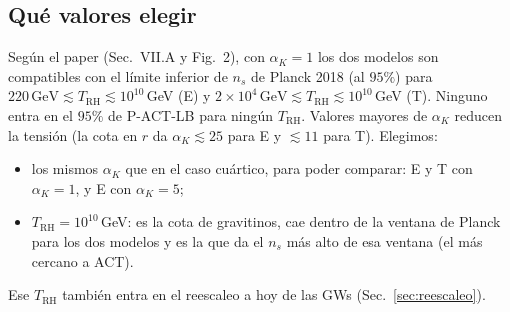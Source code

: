 \documentclass[11pt]{article}
\begin{document}
        \subsection{Qué valores elegir}

            Según el paper (Sec.~VII.A y Fig.~2), con $\alpha_K = 1$ los dos modelos son compatibles con el límite inferior de $n_s$ de Planck 2018 (al $95\%$) para $220\,\text{GeV} \lesssim T_{\text{RH}} \lesssim 10^{10}$\,GeV (E) y $2 \times 10^4\,\text{GeV} \lesssim T_{\text{RH}} \lesssim 10^{10}$\,GeV (T). Ninguno entra en el $95\%$ de P-ACT-LB para ningún $T_{\text{RH}}$. Valores mayores de $\alpha_K$ reducen la tensión (la cota en $r$ da $\alpha_K \lesssim 25$ para E y $\lesssim 11$ para T). Elegimos:
            \begin{itemize}
                \item los mismos $\alpha_K$ que en el caso cuártico, para poder comparar: E y T con $\alpha_K = 1$, y E con $\alpha_K = 5$;
                \item $T_{\text{RH}} = 10^{10}$\,GeV: es la cota de gravitinos, cae dentro de la ventana de Planck para los dos modelos y es la que da el $n_s$ más alto de esa ventana (el más cercano a ACT).
            \end{itemize}
            Ese $T_{\text{RH}}$ también entra en el reescaleo a hoy de las GWs (Sec.~\ref{sec:reescaleo}).
\end{document}
